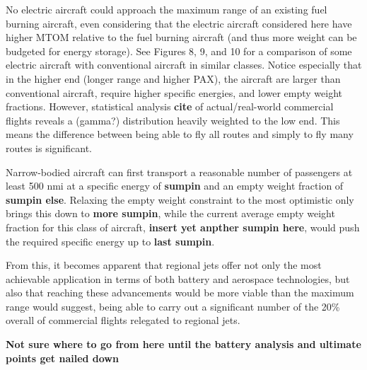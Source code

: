 No electric aircraft could approach the maximum range of an existing fuel burning aircraft, even considering that the electric aircraft considered here have higher MTOM relative to the fuel burning aircraft (and thus more weight can be budgeted for energy storage). See Figures 8, 9, and 10 for a comparison of some electric aircraft with conventional aircraft in similar classes. Notice especially that in the higher end (longer range and higher PAX), the aircraft are larger than conventional aircraft, require higher specific energies, and lower empty weight fractions. However, statistical analysis \textbf{cite} of actual/real-world commercial flights reveals a (gamma?) distribution heavily weighted to the low end. This means the difference between being able to fly all routes and simply to fly many routes is significant.  






Narrow-bodied aircraft can first transport a reasonable number of passengers  at least 500 nmi at a specific energy of \textbf{sumpin} and an empty weight fraction of \textbf{sumpin else}. Relaxing the empty weight constraint to the most optimistic only brings this down to \textbf{more sumpin}, while the current average empty weight fraction for this class of aircraft, \textbf{insert yet anpther sumpin here}, would push the required specific energy up to \textbf{last sumpin}.

From this, it becomes apparent that regional jets offer not only the most achievable application in terms of both battery and aerospace technologies, but also that reaching these advancements would be more viable than the maximum range would suggest, being able to carry out a significant number of the 20\% overall of commercial flights relegated to regional jets.














\textbf{Not sure where to go from here until the battery analysis and ultimate points get nailed down}


